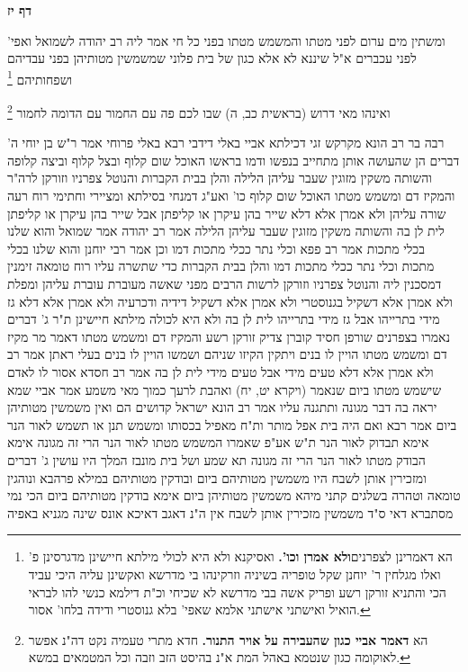 \documentclass[12pt, openany]{book}
\newcommand{\sethebfont}{
\fontsize{10.5pt}{21.0pt} \selectfont
}
\newcommand{\twocol}[1]{
	{\sethebfont \begin{multicols}{2}
			#1
	\end{multicols}}	
}
\newcommand{\sectname}{}
\newcommand{\newsection}[1]{
	\addcontentsline{toc}{section}{#1}
	\renewcommand{\sectname}{#1}	
	\vspace{-\baselineskip}
	\begin{center}
		\textbf{%
\fontsize{16pt}{16pt}\selectfont
			#1}
	\end{center}
	\vspace{-\baselineskip}
	\nopagebreak
}
\newcommand{\footnotecomment}[1]{\footnote{#1}}
\newcommand{\commenta}[1]{\footnotecomment{#1}}
\begin{document}
\newsection{דף יז}
\twocol{ומשתין מים ערום לפני מטתו והמשמש מטתו בפני כל חי  אמר ליה רב יהודה לשמואל  ואפי' לפני עכברים  א"ל  שיננא לא אלא כגון של בית פלוני שמשמשין מטותיהן בפני עבדיהם ושפחותיהם 
\commenta{ הא דאמרינן לצפרנים\textbf{ולא אמרן וכו'.}  ואסיקנא ולא היא לכולי מילתא חיישינן מדגרסינן פ' ואלו מגלחין ר' יוחנן שקל טופריה בשיניה וזרקינהו בי מדרשא ואקשינן עליה היכי עביד הכי והתניא זורקן רשע ופריק אשה בבי מדרשא לא שכיחי וכ"ת דילמא כנשי להו לבראי הואיל ואישתני אישתני אלמא שאפי' בלא גנוסטרי ודידה בלחו' אסור. }

ואינהו מאי דרוש  (בראשית כב, ה) שבו לכם פה עם החמור עם הדומה לחמור 
\commenta{ הא \textbf{דאמר אביי כגון שהעבירה על אויר התנור.}  חדא מתרי טעמיה נקט דה"נ אפשר לאוקומה כגון שנטמא באהל המת א"נ בהיסט הזב וזבה וכל המטמאים במשא. }

רבה בר רב הונא מקרקש זגי דכילתא אביי באלי דידבי רבא באלי פרוחי 
אמר ר"ש בן יוחי  ה' דברים הן שהעושה אותן מתחייב בנפשו ודמו בראשו  האוכל שום קלוף ובצל קלוף וביצה קלופה והשותה משקין מזוגין שעבר עליהן הלילה והלן בבית הקברות והנוטל צפרניו וזורקן לרה"ר והמקיז דם ומשמש מטתו
האוכל שום קלוף כו' ואע"ג דמנחי בסילתא ומציירי וחתימי רוח רעה שורה עליהן  ולא אמרן אלא דלא שייר בהן עיקרן או קליפתן אבל שייר בהן עיקרן או קליפתן לית לן בה
והשותה משקין מזוגין שעבר עליהן הלילה אמר רב יהודה אמר שמואל  והוא שלנו בכלי מתכות  אמר רב פפא  וכלי נתר ככלי מתכות דמו  וכן אמר רבי יוחנן  והוא שלנו בכלי מתכות וכלי נתר ככלי מתכות דמו
והלן בבית הקברות כדי שתשרה עליו רוח טומאה זימנין דמסכנין ליה
והנוטל צפרניו וזורקן לרשות הרבים מפני שאשה מעוברת עוברת עליהן ומפלת  ולא אמרן אלא דשקיל בגנוסטרי  ולא אמרן אלא דשקיל דידיה ודכרעיה  ולא אמרן אלא דלא גז מידי בתרייהו אבל גז מידי בתרייהו לית לן בה  ולא היא לכולה מילתא חיישינן 
ת"ר  ג' דברים נאמרו בצפרנים  שורפן חסיד קוברן צדיק זורקן רשע
והמקיז דם ומשמש מטתו דאמר מר  מקיז דם ומשמש מטתו הויין לו בנים ויתקין  הקיזו שניהם ושמשו הויין לו בנים בעלי ראתן  אמר רב  ולא אמרן אלא דלא טעים מידי אבל טעים מידי לית לן בה 
אמר רב חסדא  אסור לו לאדם שישמש מטתו ביום שנאמר  (ויקרא יט, יח) ואהבת לרעך כמוך  מאי משמע  אמר אביי  שמא יראה בה דבר מגונה ותתגנה עליו  אמר רב הונא  ישראל קדושים הם ואין משמשין מטותיהן ביום 
אמר רבא  ואם היה בית אפל מותר  ות"ח מאפיל בכסותו ומשמש 
תנן  או תשמש לאור הנר  אימא  תבדוק לאור הנר 
ת"ש  אע"פ שאמרו המשמש מטתו לאור הנר הרי זה מגונה  אימא  הבודק מטתו לאור הנר הרי זה מגונה 
תא שמע  ושל בית מונבז המלך היו עושין ג' דברים ומזכירין אותן לשבח  היו משמשין מטותיהם ביום ובודקין מטותיהם במילא פרהבא ונוהגין טומאה וטהרה בשלגים  קתני מיהא משמשין מטותיהן ביום 
אימא  בודקין מטותיהם ביום  הכי נמי מסתברא דאי ס"ד משמשין מזכירין אותן לשבח  אין ה"נ דאגב דאיכא אונס שינה מגניא באפיה 
}
\end{document}
